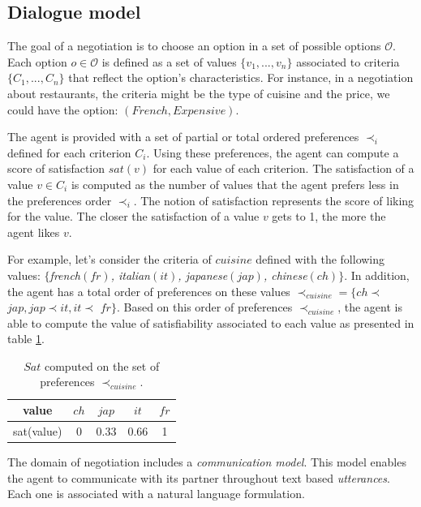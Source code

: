 \documentclass[conference, letterpaper]{IEEEtran}
\begin{document}
	
	\subsection{Dialogue model}
	
	\label{sec:dialogue-model}
	
	The goal of a negotiation is to choose an option in a set of possible options $\mathcal{O}$. Each option $o\in\mathcal{O}$ is defined as a set of values $\{v_1, ..., v_n\}$ associated to criteria $\{C_1, ..., C_n\}$ that reflect the option's characteristics.  
	For instance, in a negotiation about restaurants, the criteria might be the type of cuisine and the price, we could have the option: $(French,Expensive)$.
	
	The agent is provided with a set of partial or total ordered preferences $\prec_i$ defined for each criterion $C_i$. Using these preferences, the agent can compute a score of satisfaction $sat(v)$ for each value of each criterion. The satisfaction of a value $v \in C_i$ is computed as the number of values that the agent prefers less in the preferences order $\prec_i$. The notion of satisfaction represents the score of liking for the value. The closer the satisfaction of a value $v$ gets to 1, the more the agent likes $v$.
	 
	 
	For example, let's consider the criteria of $cuisine$ defined with the following values: $\{$\emph{french$(fr)$, italian$(it)$, japanese$(jap)$, chinese$(ch)$}$\}$. In addition, the agent has a total order of preferences on these values $\prec_{cuisine}$$=\{ch$$\prec$$jap, jap$$\prec$$it, it$$\prec$ $fr\}$. Based on this order of preferences $\prec_{cuisine}$, the agent is able to compute the value of satisfiability associated to each value as presented in table \ref{tab:sat}.
	
	\begin{table} [h]
		\centering
				\large
		\begin{tabular}{ |c|c|c|c|c| }
		\hline
		value & $ch$ & $jap$ & $it$ & $fr$ \\	
		\hline
		sat(value) & 0 & 0.33 & 0.66 & 1 \\
		\hline
	\end{tabular}
		\caption{$Sat$ computed on the set of preferences $\prec_{cuisine}$.}
		\label{tab:sat}

	\end{table}


	
	The domain of negotiation includes a \emph{communication model}. This model enables the agent to communicate with its partner throughout text based \textit{utterances}. 
	Each one is associated with a natural language formulation.%
	
\end{document}
